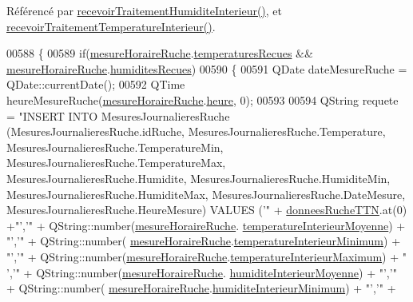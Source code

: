 Référencé par \hyperlink{class_ruche_a6d4c59f2850f803a0ed1946e737b4262}{recevoir\+Traitement\+Humidite\+Interieur()}, et \hyperlink{class_ruche_a2d2a681916140b977d45423d0d5d7b34}{recevoir\+Traitement\+Temperature\+Interieur()}.


\begin{DoxyCode}
00588 \{
00589     \textcolor{keywordflow}{if}(\hyperlink{class_ruche_a9a68d3b7eb272e139f1532fdcbca2da3}{mesureHoraireRuche}.\hyperlink{struct_mesure_horaire_ruche_ade9984cb0f2c62b3ba1369f77249bb4a}{temperaturesRecues} && 
      \hyperlink{class_ruche_a9a68d3b7eb272e139f1532fdcbca2da3}{mesureHoraireRuche}.\hyperlink{struct_mesure_horaire_ruche_a4f825f05bf4e61db7b18a08dee759b7a}{humiditesRecues})
00590     \{
00591         QDate dateMesureRuche = QDate::currentDate();
00592         QTime heureMesureRuche(\hyperlink{class_ruche_a9a68d3b7eb272e139f1532fdcbca2da3}{mesureHoraireRuche}.\hyperlink{struct_mesure_horaire_ruche_ab679cc7168deb6c3d2458c99b94e0611}{heure}, 0);
00593 
00594         QString requete = \textcolor{stringliteral}{"INSERT INTO MesuresJournalieresRuche (MesuresJournalieresRuche.idRuche,
       MesuresJournalieresRuche.Temperature, MesuresJournalieresRuche.TemperatureMin,
       MesuresJournalieresRuche.TemperatureMax, MesuresJournalieresRuche.Humidite, MesuresJournalieresRuche.HumiditeMin,
       MesuresJournalieresRuche.HumiditeMax, MesuresJournalieresRuche.DateMesure, MesuresJournalieresRuche.HeureMesure) VALUES ('"} + 
      \hyperlink{class_ruche_a4556832042641c08a6ef2ab9d80d771e}{donneesRucheTTN}.at(0) +\textcolor{stringliteral}{"','"} + QString::number(\hyperlink{class_ruche_a9a68d3b7eb272e139f1532fdcbca2da3}{mesureHoraireRuche}.
      \hyperlink{struct_mesure_horaire_ruche_ac240bf701116e1a09f2bf33911bf57ef}{temperatureInterieurMoyenne}) + \textcolor{stringliteral}{"','"} + QString::number(
      \hyperlink{class_ruche_a9a68d3b7eb272e139f1532fdcbca2da3}{mesureHoraireRuche}.\hyperlink{struct_mesure_horaire_ruche_a51c45378a78c733704df79b38d61afcc}{temperatureInterieurMinimum}) + \textcolor{stringliteral}{"','"} + 
      QString::number(\hyperlink{class_ruche_a9a68d3b7eb272e139f1532fdcbca2da3}{mesureHoraireRuche}.\hyperlink{struct_mesure_horaire_ruche_a746c391a70735bfff63bf7271ab28ab8}{temperatureInterieurMaximum}) + \textcolor{stringliteral}{"
      ','"} + QString::number(\hyperlink{class_ruche_a9a68d3b7eb272e139f1532fdcbca2da3}{mesureHoraireRuche}.
      \hyperlink{struct_mesure_horaire_ruche_a46f517d342e230b4e3d0b84a96b79aac}{humiditeInterieurMoyenne}) + \textcolor{stringliteral}{"','"} + QString::number(
      \hyperlink{class_ruche_a9a68d3b7eb272e139f1532fdcbca2da3}{mesureHoraireRuche}.\hyperlink{struct_mesure_horaire_ruche_adf0cbf1a3451cced1ba6fb9573654236}{humiditeInterieurMinimum}) + \textcolor{stringliteral}{"','"} + 

\end{DoxyCode}
